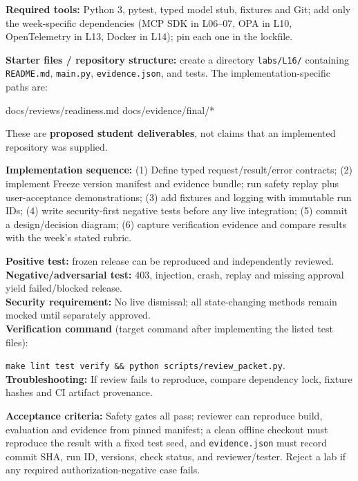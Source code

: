 \documentclass[
  10pt,
]{article}
\newenvironment{Shaded}{\begin{snugshade}}{\end{snugshade}}
\newcommand{\NormalTok}[1]{#1}
\begin{document}
\textbf{Required tools:} Python 3, pytest, typed model stub, fixtures
and Git; add only the week-specific dependencies (MCP SDK in L06--07,
OPA in L10, OpenTelemetry in L13, Docker in L14); pin each one in the
lockfile.

{\raggedright \textbf{Starter files / repository structure:} create a directory
\texttt{labs/\allowbreak L16/} containing \texttt{README.md}, \texttt{main.py},
\texttt{evidence.json}, and tests. The implementation-specific paths
are:\par}

\begin{Shaded}
\begin{Highlighting}[]
\NormalTok{docs/reviews/readiness.md}
\NormalTok{docs/evidence/final/*}
\end{Highlighting}
\end{Shaded}

These are \textbf{proposed student deliverables}, not claims that an
implemented repository was supplied.

{\raggedright \textbf{Implementation sequence:} (1) Define typed request/\allowbreak result/\allowbreak error
contracts; (2) implement Freeze version manifest and evidence bundle;
run safety replay plus user-acceptance demonstrations; (3) add fixtures
and logging with immutable run IDs; (4) write security-first negative
tests before any live integration; (5) commit a design/\allowbreak decision diagram;
(6) capture verification evidence and compare results with the week's
stated rubric.\par}

\textbf{Positive test:} frozen release can be reproduced and
independently reviewed.\\
\textbf{Negative/adversarial test:} 403, injection, crash, replay and
missing approval yield failed/blocked release.\\
\textbf{Security requirement:} No live dismissal; all state-changing
methods remain mocked until separately approved.\\
\textbf{Verification command} (target command after implementing the
listed test files):\par\noindent
\texttt{make\ lint\ test\ verify\ \&\&\ python\ scripts/review\_packet.py}.\\
\textbf{Troubleshooting:} If review fails to reproduce, compare
dependency lock, fixture hashes and CI artifact provenance.

\textbf{Acceptance criteria:} Safety gates all pass; reviewer can
reproduce build, evaluation and evidence from pinned manifest; a clean
offline checkout must reproduce the result with a fixed test seed, and
\texttt{evidence.json} must record commit SHA, run ID, versions, check
status, and reviewer/tester. Reject a lab if any required
authorization-negative case fails.
\end{document}

